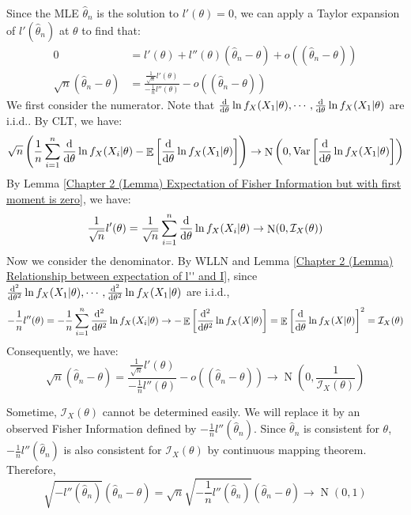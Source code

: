 \documentclass{huhtakm-template-book-v2}
\DeclareMathOperator{\E}{\mathbb{E}}
\DeclareMathOperator{\Var}{Var}
\DeclareMathOperator{\N}{N}
\begin{document}
\begin{proofing}
	Since the MLE $\hat{\theta}_{n}$ is the solution to $l'(\theta)=0$, we can apply a Taylor expansion of $l'(\hat{\theta}_{n})$ at $\theta$ to find that:
	\begin{align*}
		0&=l'(\theta)+l''(\theta)(\hat{\theta}_{n}-\theta)+o((\hat{\theta}_{n}-\theta))\\
		\sqrt{n}(\hat{\theta}_{n}-\theta)&=\frac{\frac{1}{\sqrt{n}}l'(\theta)}{-\frac{1}{n}l''(\theta)}-o((\hat{\theta}_{n}-\theta))
	\end{align*}
	We first consider the numerator. Note that $\odv*{}{\theta}\ln{f_{X}(X_{1}|\theta)},\cdots,\odv*{}{\theta}\ln{f_{X}(X_{1}|\theta)}$ are i.i.d.. By CLT, we have:
	\begin{equation*}
		\sqrt{n}\left(\frac{1}{n}\sum_{i=1}^{n}\odv*{}{\theta}\ln{f_{X}(X_{i}|\theta)}-\E\left[\odv*{}{\theta}\ln{f_{X}(X_{1}|\theta)}\right]\right)\to\N\left(0,\Var\left[\odv*{}{\theta}\ln{f_{X}(X_{1}|\theta)}\right]\right)
	\end{equation*}
	By Lemma \ref{Chapter 2 (Lemma) Expectation of Fisher Information but with first moment is zero}, we have:
	\begin{equation*}
		\frac{1}{\sqrt{n}}l'(\theta)=\frac{1}{\sqrt{n}}\sum_{i=1}^{n}\odv*{}{\theta}\ln{f_{X}(X_{i}|\theta)}\to\N(0,\mathcal{I}_{X}(\theta))
	\end{equation*}
	Now we consider the denominator. By WLLN and Lemma \ref{Chapter 2 (Lemma) Relationship between expectation of l'' and I}, since $\odv*[order={2}]{}{\theta}\ln{f_{X}(X_{1}|\theta)},\cdots,\odv*[order={2}]{}{\theta}\ln{f_{X}(X_{1}|\theta)}$ are i.i.d.,
	\begin{equation*}
		-\frac{1}{n}l''(\theta)=-\frac{1}{n}\sum_{i=1}^{n}\odv*[order={2}]{}{\theta}\ln{f_{X}(X_{i}|\theta)}\to-\E\left[\odv*[order={2}]{}{\theta}\ln{f_{X}(X|\theta)}\right]=\E\left[\odv*{}{\theta}\ln{f_{X}(X|\theta)}\right]^{2}=\mathcal{I}_{X}(\theta)
	\end{equation*}
	Consequently, we have:
	\begin{equation*}
		\sqrt{n}(\hat{\theta}_{n}-\theta)=\frac{\frac{1}{\sqrt{n}}l'(\theta)}{-\frac{1}{n}l''(\theta)}-o((\hat{\theta}_{n}-\theta))\to\N\left(0,\frac{1}{\mathcal{I}_{X}(\theta)}\right)
	\end{equation*}
\end{proofing}
\begin{rem}
	Sometime, $\mathcal{I}_{X}(\theta)$ cannot be determined easily. We will replace it by an observed Fisher Information defined by $-\frac{1}{n}l''(\hat{\theta}_{n})$. Since $\hat{\theta}_{n}$ is consistent for $\theta$, $-\frac{1}{n}l''(\hat{\theta}_{n})$ is also consistent for $\mathcal{I}_{X}(\theta)$ by continuous mapping theorem. Therefore,
	\begin{equation*}
		\sqrt{-l''(\hat{\theta}_{n})}(\hat{\theta}_{n}-\theta)=\sqrt{n}\sqrt{-\frac{1}{n}l''(\hat{\theta}_{n})}(\hat{\theta}_{n}-\theta)\to\N(0,1)
	\end{equation*}
\end{rem}
\end{document}
